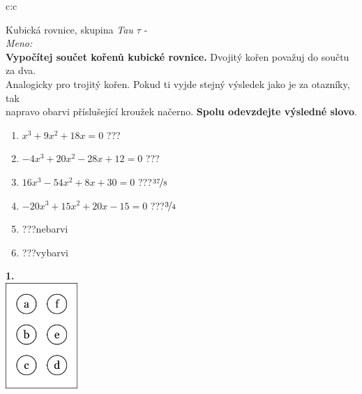 \documentclass[10pt]{report}
\begin{document}
\begin{tabular}{c:c}
\begin{minipage}[c][99mm][t]{0.49\linewidth}
\begin{center}
\vspace{7mm}
{\huge Kubická rovnice, skupina \textit{Tau $\tau$} -}\\[4.5mm]
\textit{Meno:}\phantom{xxxxxxxxxxxxxxxxxxxxxxxxxxxxxxxxxxxxxxxxxxxxxxxxxxxxxxxxxxxxxxxxx}\\[3.5mm]
\textbf{Vypočítej součet kořenů kubické rovnice.} Dvojitý kořen považuj do součtu za dva.\\Analogicky pro trojitý kořen. Pokud ti vyjde stejný výsledek jako je za otazníky, tak\\napravo obarvi příslušející kroužek načerno. \textbf{Spolu odevzdejte výsledné slovo}.\\[3mm]
\begin{minipage}{0.77\linewidth}
\begin{center}
\begin{varwidth}{\textwidth}
\begin{enumerate}
\large
\item $x^3+9x^2+18x=0$\quad \dotfill\; ???\;\dotfill {}
\item $-4x^3+20x^2-28x+12=0$\quad \dotfill\; ???\;\dotfill {}
\item $16x^3-54x^2+8x+30=0$\quad \dotfill\; ???\;\dotfill \quad $\nicefrac{37}{8}$
\item $-20x^3+15x^2+20x-15=0$\quad \dotfill\; ???\;\dotfill \quad $\nicefrac{3}{4}$
\item \quad \dotfill\; ???\;\dotfill \quad nebarvi
\item \quad \dotfill\; ???\;\dotfill \quad vybarvi
\end{enumerate}
\end{varwidth}
\end{center}
\end{minipage}
\begin{minipage}{0.20\linewidth}
\begin{center}
{\Huge\bfseries 1.} \\[2mm]
\includegraphics[height=40mm]{../images/braille.png}

\end{center}
\end{minipage}
\end{center}
\end{minipage}
\end{tabular}
\end{document}
